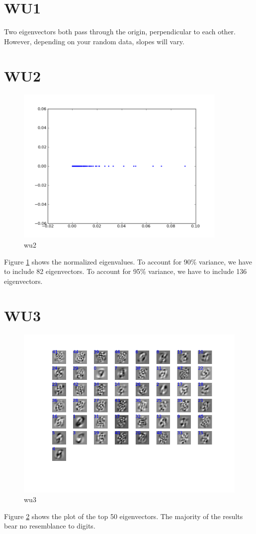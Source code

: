 \section*{WU1}
Two eigenvectors both pass through the origin, perpendicular to each other. However, depending on your random data, slopes will vary. 

\section*{WU2}

\begin{figure}[here]
	\center
	\caption{wu2}
	\label{fig:wu2}
	\includegraphics[width=4.0in]{img/wu2.png}
\end{figure}
Figure \ref{fig:wu2} shows the normalized eigenvalues.
To account for 90\% variance, we have to include 82 eigenvectors.
To account for 95\% variance, we have to include 136 eigenvectors.


\section*{WU3}
\begin{figure}[here]
	\center
	\caption{wu3}
	\label{fig:wu3}
	\includegraphics[width=6.0in]{img/wu3.png}
\end{figure}
Figure \ref{fig:wu3} shows the plot of the top 50 eigenvectors. The majority of the results bear no resemblance to digits. 